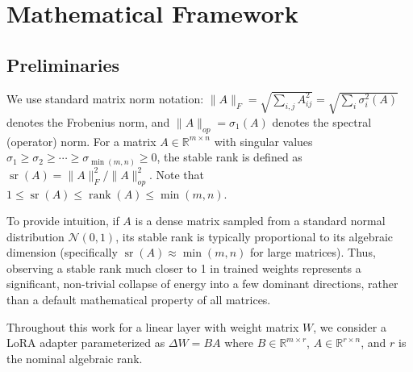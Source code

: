 \documentclass[a4paper,14pt]{extarticle}
\DeclareMathOperator{\rank}{rank}
\DeclareMathOperator{\sr}{sr}
\begin{document}
    \section{Mathematical Framework}


    \subsection{Preliminaries}
    
    We use standard matrix norm notation: $\|A\|_F = \sqrt{\sum_{i,j} A_{ij}^2} = \sqrt{\sum_{i} \sigma_i^2(A)}$ denotes the Frobenius norm, and $\|A\|_{op} = \sigma_1(A)$ denotes the spectral (operator) norm. For a matrix $A \in \mathbb{R}^{m \times n}$ with singular values $\sigma_1 \geq \sigma_2 \geq \cdots \geq \sigma_{\min(m,n)} \geq 0$, the stable rank is defined as $\sr(A) = \|A\|_F^2 / \|A\|_{op}^2$. Note that $1 \leq \sr(A) \leq \rank(A) \leq \min(m, n)$. 

    To provide intuition, if $A$ is a dense matrix sampled from a standard normal distribution $\mathcal{N}(0, 1)$, its stable rank is typically proportional to its algebraic dimension (specifically $\sr(A) \approx \min(m,n)$ for large matrices). Thus, observing a stable rank much closer to 1 in trained weights represents a significant, non-trivial collapse of energy into a few dominant directions, rather than a default mathematical property of all matrices.
    
    Throughout this work for a linear layer with weight matrix $W$, we consider a LoRA adapter parameterized as $\Delta W = BA$ where $B \in \mathbb{R}^{m \times r}$, $A \in \mathbb{R}^{r \times n}$, and $r$ is the nominal algebraic rank.
\end{document}
